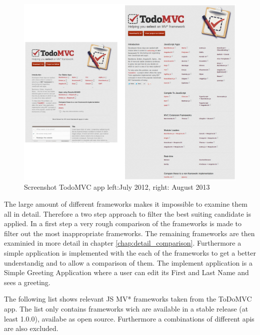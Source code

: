 \begin{figure}
	\centering	\includegraphics[width=1.0\textwidth]{./img/todo_mvc_app_comparison.png}
	\caption{Screenshot TodoMVC app left:July 2012, right: August 2013~}
	\label{fig:todoMvcComp}
\end{figure}
    

The large amount of different frameworks makes it impossible to examine them all in detail. Therefore a two step approach to filter the best suiting candidate is applied. In a first step a very rough comparison of the frameworks is made to filter out the most inappropriate frameworks. The remaining frameworks are then examinied in more detail in chapter \ref{chap:detail_comparison}. Furthermore a simple application is implemented with the each of the frameworks to get a better understandig and to allow a comparison of them. The implement application is a Simple Greeting Application where a user can edit its First and Last Name and sees a greeting.  


The following list shows relevant JS MV* frameworks taken from the ToDoMVC app. The list only contains frameworks wich are available in a stable release (at least 1.0.0), availabe as open source. Furthermore a combinations of different apis are also excluded. 

